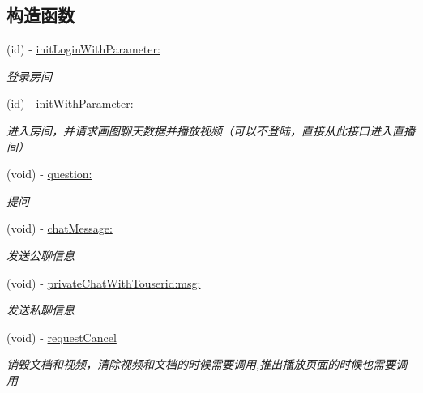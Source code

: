 \subsection*{构造函数}
\begin{DoxyCompactItemize}
\item 
(id) -\/ \hyperlink{interface_request_data_aca8fabcea46e00a3e5a918f0668254f9}{init\+Login\+With\+Parameter\+:}
\begin{DoxyCompactList}\small\item\em 登录房间 \end{DoxyCompactList}\item 
(id) -\/ \hyperlink{interface_request_data_a67af7937b840135d7240c35aa5a5f78a}{init\+With\+Parameter\+:}
\begin{DoxyCompactList}\small\item\em 进入房间，并请求画图聊天数据并播放视频（可以不登陆，直接从此接口进入直播间） \end{DoxyCompactList}\item 
(void) -\/ \hyperlink{interface_request_data_a2e886316ef2970f8d97020221fe80c56}{question\+:}
\begin{DoxyCompactList}\small\item\em 提问 \end{DoxyCompactList}\item 
(void) -\/ \hyperlink{interface_request_data_ae859b4435402fd2c676f43fa3ba1fcf1}{chat\+Message\+:}
\begin{DoxyCompactList}\small\item\em 发送公聊信息 \end{DoxyCompactList}\item 
\mbox{\label{interface_request_data_a2b64c1bf11fd8476f06f663f1df9fefa}} 
(void) -\/ \hyperlink{interface_request_data_a2b64c1bf11fd8476f06f663f1df9fefa}{private\+Chat\+With\+Touserid\+:msg\+:}
\begin{DoxyCompactList}\small\item\em 发送私聊信息 \end{DoxyCompactList}\item 
\mbox{\label{interface_request_data_a7af614d3cf16583da1df36ab5c4b45b9}} 
(void) -\/ \hyperlink{interface_request_data_a7af614d3cf16583da1df36ab5c4b45b9}{request\+Cancel}
\begin{DoxyCompactList}\small\item\em 销毁文档和视频，清除视频和文档的时候需要调用,推出播放页面的时候也需要调用 \end{DoxyCompactList}\item 

\end{DoxyCompactItemize}
